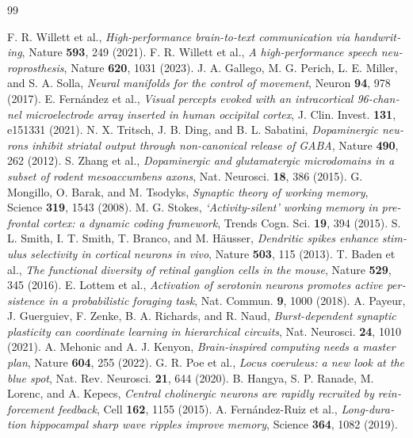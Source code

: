 \begin{thebibliography}{99}
\begin{otherlanguage}{english}
 F. R. Willett et al., \emph{High-performance brain-to-text communication via handwriting}, Nature \textbf{593}, 249 (2021).
 F. R. Willett et al., \emph{A high-performance speech neuroprosthesis}, Nature \textbf{620}, 1031 (2023).
 J. A. Gallego, M. G. Perich, L. E. Miller, and S. A. Solla, \emph{Neural manifolds for the control of movement}, Neuron \textbf{94}, 978 (2017).
 E. Fern\'andez et al., \emph{Visual percepts evoked with an intracortical 96-channel microelectrode array inserted in human occipital cortex}, J. Clin. Invest. \textbf{131}, e151331 (2021).
 N. X. Tritsch, J. B. Ding, and B. L. Sabatini, \emph{Dopaminergic neurons inhibit striatal output through non-canonical release of GABA}, Nature \textbf{490}, 262 (2012).
 S. Zhang et al., \emph{Dopaminergic and glutamatergic microdomains in a subset of rodent mesoaccumbens axons}, Nat. Neurosci. \textbf{18}, 386 (2015).
 G. Mongillo, O. Barak, and M. Tsodyks, \emph{Synaptic theory of working memory}, Science \textbf{319}, 1543 (2008).
 M. G. Stokes, \emph{`Activity-silent' working memory in prefrontal cortex: a dynamic coding framework}, Trends Cogn. Sci. \textbf{19}, 394 (2015).
 S. L. Smith, I. T. Smith, T. Branco, and M. H\"ausser, \emph{Dendritic spikes enhance stimulus selectivity in cortical neurons in vivo}, Nature \textbf{503}, 115 (2013).
 T. Baden et al., \emph{The functional diversity of retinal ganglion cells in the mouse}, Nature \textbf{529}, 345 (2016).
 E. Lottem et al., \emph{Activation of serotonin neurons promotes active persistence in a probabilistic foraging task}, Nat. Commun. \textbf{9}, 1000 (2018).
 A. Payeur, J. Guerguiev, F. Zenke, B. A. Richards, and R. Naud, \emph{Burst-dependent synaptic plasticity can coordinate learning in hierarchical circuits}, Nat. Neurosci. \textbf{24}, 1010 (2021).
 A. Mehonic and A. J. Kenyon, \emph{Brain-inspired computing needs a master plan}, Nature \textbf{604}, 255 (2022).
 G. R. Poe et al., \emph{Locus coeruleus: a new look at the blue spot}, Nat. Rev. Neurosci. \textbf{21}, 644 (2020).
 B. Hangya, S. P. Ranade, M. Lorenc, and A. Kepecs, \emph{Central cholinergic neurons are rapidly recruited by reinforcement feedback}, Cell \textbf{162}, 1155 (2015).
 A. Fern\'andez-Ruiz et al., \emph{Long-duration hippocampal sharp wave ripples improve memory}, Science \textbf{364}, 1082 (2019).

\end{otherlanguage}
\end{thebibliography}
